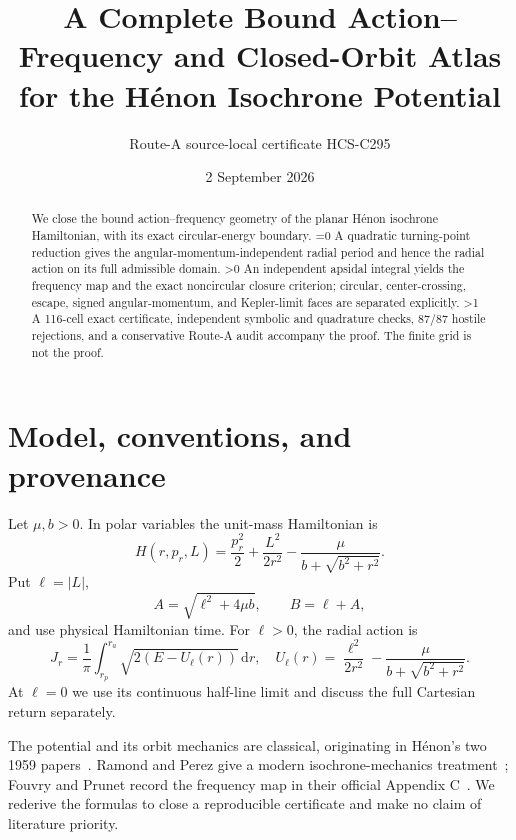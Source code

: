 \documentclass[10pt]{article}
\title{A Complete Bound Action--Frequency and Closed-Orbit Atlas\\
for the H\'enon Isochrone Potential}
\author{Route-A source-local certificate HCS-C295}
\date{2 September 2026}
\providecommand{\CRevisionRound}{2}
\newcommand{\D}{\mathrm d}
\newcommand{\abs}[1]{\lvert#1\rvert}
\begin{document}
\maketitle

\begin{abstract}
We close the bound action--frequency geometry of the planar H\'enon
isochrone Hamiltonian, with its exact circular-energy boundary.
\ifnum\CRevisionRound=0
A quadratic turning-point reduction gives the angular-momentum-independent
radial period and hence the radial action on its full admissible domain.
\fi
\ifnum\CRevisionRound>0
An independent apsidal integral yields the frequency map and the exact
noncircular closure criterion; circular, center-crossing, escape, signed
angular-momentum, and Kepler-limit faces are separated explicitly.
\fi
\ifnum\CRevisionRound>1
A 116-cell exact certificate, independent symbolic and quadrature checks,
87/87 hostile rejections, and a conservative Route-A audit accompany the
proof.  The finite grid is not the proof.
\fi
\end{abstract}

\section{Model, conventions, and provenance}
Let \(\mu,b>0\).  In polar variables the unit-mass Hamiltonian is
\begin{equation}\label{eq:H}
 H(r,p_r,L)=\frac{p_r^2}{2}+\frac{L^2}{2r^2}
 -\frac{\mu}{b+\sqrt{b^2+r^2}}.
\end{equation}
Put \(\ell=\abs L\),
\begin{equation}\label{eq:AB}
 A=\sqrt{\ell^2+4\mu b},\qquad B=\ell+A,
\end{equation}
and use physical Hamiltonian time.  For \(\ell>0\), the radial action is
\begin{equation}\label{eq:actiondef}
 J_r=\frac1\pi\int_{r_p}^{r_a}
 \sqrt{2(E-U_\ell(r))}\,\D r,
 \quad
 U_\ell(r)=\frac{\ell^2}{2r^2}
 -\frac{\mu}{b+\sqrt{b^2+r^2}}.
\end{equation}
At \(\ell=0\) we use its continuous half-line limit and discuss the full
Cartesian return separately.

The potential and its orbit mechanics are classical, originating in
H\'enon's two 1959 papers~\cite{HenonI,HenonII}.  Ramond and Perez give a
modern isochrone-mechanics treatment~\cite{RamondPerez}; Fouvry and Prunet
record the frequency map in their official Appendix C~\cite{FouvryPrunet}.
We rederive the formulas to close a reproducible certificate and make no
claim of literature priority.
\end{document}

